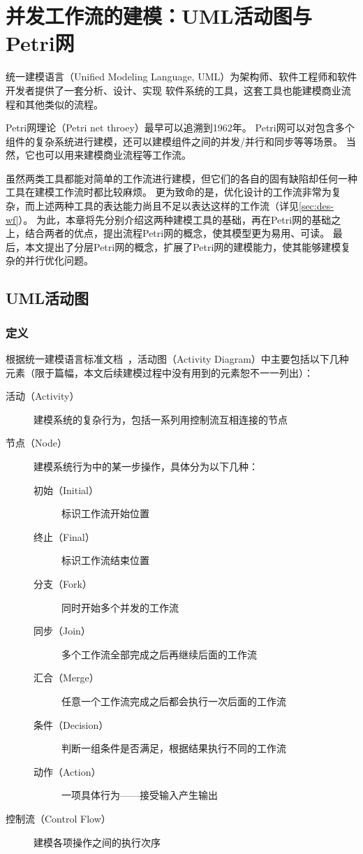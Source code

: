 \documentclass[index]{subfiles}
\begin{document}
\chapter{并发工作流的建模：UML活动图与Petri网}
统一建模语言（Unified Modeling Language, UML）为架构师、软件工程师和软件开发者提供了一套分析、设计、实现
软件系统的工具，这套工具也能建模商业流程和其他类似的流程\cite{omg}。

Petri网理论（Petri net throey）最早可以追溯到1962年\cite{petri1962}。
Petri网可以对包含多个组件的复杂系统进行建模，还可以建模组件之间的并发/并行和同步等等场景\cite{peterson1981}。
当然，它也可以用来建模商业流程等工作流\cite{ellis1993}。

虽然两类工具都能对简单的工作流进行建模，但它们的各自的固有缺陷却任何一种工具在建模工作流时都比较麻烦。
更为致命的是，优化设计的工作流非常为复杂，而上述两种工具的表达能力尚且不足以表达这样的工作流（详见\cref{sec:des-wf}）。
为此，本章将先分别介绍这两种建模工具的基础，再在Petri网的基础之上，结合两者的优点，提出流程Petri网的概念，使其模型更为易用、可读。
最后，本文提出了分层Petri网的概念，扩展了Petri网的建模能力，使其能够建模复杂的并行优化问题。

\section{UML活动图}
\subsection{定义}
根据统一建模语言标准文档~，活动图（Activity Diagram）中主要包括以下几种元素（限于篇幅，本文后续建模过程中没有用到的元素恕不一一列出）：
\begin{description}
  \item[活动（Activity）] 建模系统的复杂行为，包括一系列用控制流互相连接的节点
  \item[节点（Node）] 建模系统行为中的某一步操作，具体分为以下几种：
  \begin{description}
    \item[初始（Initial）] 标识工作流开始位置
    \item[终止（Final）] 标识工作流结束位置
    \item[分支（Fork）] 同时开始多个并发的工作流
    \item[同步（Join）] 多个工作流全部完成之后再继续后面的工作流
    \item[汇合（Merge）] 任意一个工作流完成之后都会执行一次后面的工作流
    \item[条件（Decision）] 判断一组条件是否满足，根据结果执行不同的工作流
    \item[动作（Action）] 一项具体行为——接受输入产生输出
  \end{description}
  \item[控制流（Control Flow）] 建模各项操作之间的执行次序
\end{description}
\end{document}
